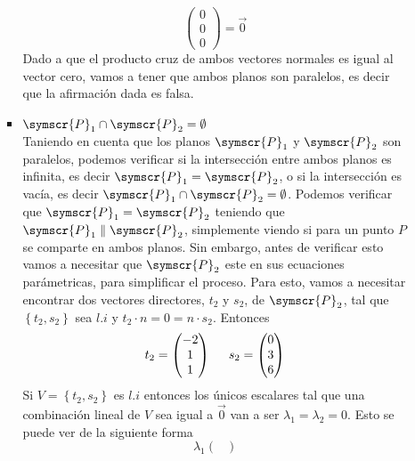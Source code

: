 \documentclass{article}
\def\fancyP{\symscr{P}}
\begin{document}
\begin{enumerate}
\begin{itemize}
\begin{itemize}
\[\begin{pmatrix}
                            0 \\ 0 \\ 0
                        \end{pmatrix}
                        =
                        \vec{0}
                    \]
                    Dado a que el producto cruz de ambos vectores normales es igual al vector cero, vamos a tener que ambos planos son paralelos, es decir 
                    que la afirmación dada es falsa.
                \item \(\fancyP_1 \cap \fancyP_2 = \emptyset\) \\
                    Taniendo en cuenta que los planos \(\fancyP_1\) y \(\fancyP_2\) son paralelos, podemos verificar si la intersección entre ambos planos es infinita, 
                    es decir \(\fancyP_1 = \fancyP_2\), o si la intersección es vacía, es decir \(\fancyP_1 \cap \fancyP_2 = \emptyset\).
                    Podemos verificar que \(\fancyP_1 = \fancyP_2\) teniendo que \(\fancyP_1 \parallel \fancyP_2\), simplemente viendo si para un punto \(P\) se comparte
                    en ambos planos. Sin embargo, antes de verificar esto vamos a necesitar que \(\fancyP_2\) este en sus ecuaciones parámetricas, para simplificar el proceso.
                    Para esto, vamos a necesitar encontrar dos vectores directores, \(t_2\) y \(s_2\), de \(\fancyP_2\), tal que \(\left\{t_2, s_2\right\}\) sea \(l.i\) y 
                    \(t_2 \cdot n = 0 = n \cdot s_2\). Entonces
                    \[
                        t_2 = 
                        \begin{pmatrix}
                            -2 \\ 1 \\ 1
                        \end{pmatrix}
                        \hspace{0.5cm}
                        s_2  =
                        \begin{pmatrix}
                            0 \\ 3 \\ 6
                        \end{pmatrix}
                    \]
                    Si \(V = \left\{t_2, s_2\right\}\) es \(l.i\) entonces los únicos escalares tal que una combinación lineal de \(V\) sea igual a \(\vec{0}\) van a ser \(\lambda_1 = \lambda_2 = 0\).
                    Esto se puede ver de la siguiente forma 
                    \[
                        \lambda_1 
                        \begin{pmatrix}

\end{pmatrix}\]
\end{itemize}
\end{itemize}
\end{enumerate}
\end{document}
